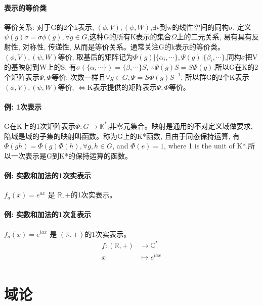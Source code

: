 \documentclass[UTF8]{../09-Mathematics}
\begin{document}
\subsubsection{表示的等价类}
等价关系: 对于G的2个k表示, $(\phi,V),(\psi,W)$,$\exists$v到w的线性空间的同构$\sigma$, 定义$\psi(g)\sigma =\sigma \phi (g), \forall g \in G$,这种G的所有K表示的集合$\Omega$上的二元关系, 易有具有反射性, 对称性, 传递性, 从而是等价关系。通常关注G的k表示的等价类。\\
$(\phi,V),(\psi,W)$等价, 取基后的矩阵记为$\Phi (g)| \{\alpha _i, \cdots\},\Psi (g)| \{\beta _i, \cdots\}$,同构$\sigma$把V的基映射到W上的S, 有$\sigma (\{\alpha , \cdots\})=\{\beta, \cdots\}S$, $\therefore \Psi (g)S=S\Phi(g)$.所以G在K的2个矩阵表示$\Psi, \Phi$等价: 次数一样且$\forall g \in G,\Psi =S\Phi (g)S^{-1}$. 所以群G的2个K表示$(\phi,V),(\psi,W)$等价, $\Leftrightarrow$K表示提供的矩阵表示$\Psi, \Phi$等价。
\subsubsection{例: 1次表示}
G在K上的1次矩阵表示$\Phi: G \to \mathbb K^*$;非零元集合。映射是通用的不对定义域做要求, 陪域是域的子集的映射叫函数。称为G上的K*函数, 且由于同态保持运算, 有$\Phi (gh)=\Phi (g)\Phi(h), \forall g,h \in G$, and $\Phi(e)=1$, where 1 is the unit of K*.所以一次表示是G到K*的保持运算的函数。

\subsubsection{例: 实数和加法的1次实表示}
$f_a(x)=e^{ax}$ 是 $\mathbb R, +$的1次实表示。

\subsubsection{例: 实数和加法的1次复表示}
$f_a(x)=e^{iax}$ 是 $(\mathbb R, +)$的1次实表示。
\begin{equation}
\label{fubiaohsi}
\begin{split}
f:(\mathbb R, +) &\to \mathbb C^*\\
x  &\mapsto e^{iax}\\
\end{split}
\end{equation}
 



\chapter{域论}
\end{document}
